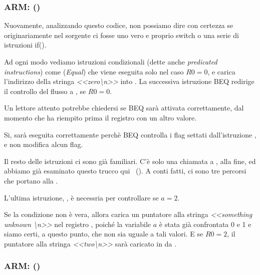 \subsubsection{ARM: \OptimizingKeilVI (\ARMMode)}



Nuovamente, analizzando questo codice, non possiamo dire con certezza se originariamente nel sorgente ci fosse uno vero e proprio switch
o una serie di istruzioni if().


Ad ogni modo vediamo istruzioni condizionali (dette anche \emph{predicated instructions}) come \ADREQ (\emph{Equal})
che viene eseguita solo nel caso $R0=0$, e carica l'indirizzo della stringa \emph{<<zero\textbackslash{}n>>}
into .
La successiva istruzione \ac{BEQ} redirige il controllo del flusso a , se $R0=0$.

Un lettore attento potrebbe chiedersi se \ac{BEQ} sarà attivata correttamente, dal momento che \ADREQ
ha riempito prima il registro  con un altro valore.

Si, sarà eseguita correttamente perchè \ac{BEQ} controlla i flag settati dall'istruzione \CMP, 
e \ADREQ non modifica alcun flag.

Il resto delle istruzioni ci sono già familiari. C'è solo una chiamata a \printf, alla fine, ed abbiamo già esaminato
questo trucco qui ~().
A conti fatti, ci sono tre percorsi che portano alla \printf{}.

L'ultima istruzione, , è necessria per controllare se $a=2$.

Se la condizione non è vera, allora \ADRNE carica un puntatore alla stringa \emph{<<something unknown \textbackslash{}n>>}
nel registro , poiché la variabile $a$ è stata già confrontata 0 e 1 e siamo certi, a questo punto, 
che non sia uguale a tali valori.
E se $R0=2$, il puntatore alla stringa \emph{<<two\textbackslash{}n>>} sarà caricato in  da \ADREQ.

\subsubsection{ARM: \OptimizingKeilVI (\ThumbMode)}



